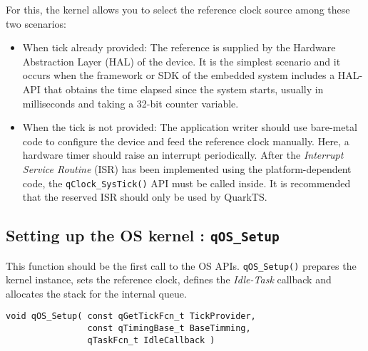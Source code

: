 For this, the kernel allows you to select the reference clock source among these two scenarios:

\begin{itemize}
    \item  When tick already provided: The reference is supplied by the Hardware Abstraction Layer (HAL) of the device.
        It is the simplest scenario and it occurs when the framework or SDK of the embedded system includes a HAL-API that obtains the time elapsed since the system starts, usually in milliseconds and taking a  32-bit counter variable.
    \item When the tick is not provided: The application writer should use bare-metal code to configure the device and feed the reference clock manually.
        Here, a hardware timer should raise an interrupt periodically. After the \textit{Interrupt Service Routine} (ISR) has been implemented using the platform-dependent code, the \lstinline{qClock_SysTick()}  API must be called inside. It is recommended that the reserved ISR should only be used by QuarkTS.
\end{itemize}

\subsection{Setting up the OS kernel : \texorpdfstring{\lstinline{qOS_Setup}}{qOS_Setup} } \label{settingupkernel}
 This function should be the first call to the OS APIs. \lstinline{qOS_Setup()}  prepares the kernel instance, sets the reference clock, defines the \textit{Idle-Task} callback and allocates the stack for the internal queue.
\medskip 
 
\begin{lstlisting}[style=CStyle]
void qOS_Setup( const qGetTickFcn_t TickProvider, 
                const qTimingBase_t BaseTimming, 
                qTaskFcn_t IdleCallback )
\end{lstlisting}

